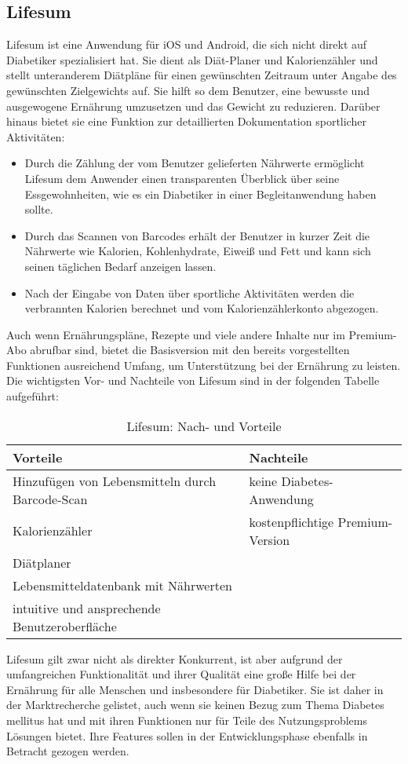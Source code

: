 	\subsection{Lifesum}
	Lifesum ist eine Anwendung für iOS und Android, die sich nicht direkt auf Diabetiker spezialisiert hat. Sie dient als Diät-Planer und Kalorienzähler und stellt unteranderem Diätpläne für einen gewünschten Zeitraum unter Angabe des gewünschten Zielgewichts auf. Sie hilft so dem Benutzer, eine bewusste und ausgewogene Ernährung umzusetzen und das Gewicht zu reduzieren. Darüber hinaus bietet sie eine Funktion zur detaillierten Dokumentation sportlicher Aktivitäten:
	\begin{itemize}
		\item Durch die Zählung der vom Benutzer gelieferten Nährwerte ermöglicht Lifesum dem Anwender einen transparenten Überblick über seine Essgewohnheiten, wie es ein Diabetiker in einer Begleitanwendung haben sollte. 
		\item Durch das Scannen von Barcodes erhält der Benutzer  in kurzer Zeit die Nährwerte wie Kalorien, Kohlenhydrate, Eiweiß und Fett und kann sich seinen täglichen Bedarf anzeigen lassen.
		\item Nach der Eingabe von Daten über sportliche Aktivitäten werden die verbrannten Kalorien berechnet und vom Kalorienzählerkonto abgezogen.
	\end{itemize}
	Auch wenn Ernährungspläne, Rezepte und viele andere Inhalte nur im Premium-Abo abrufbar sind, bietet die Basisversion mit den bereits vorgestellten Funktionen ausreichend Umfang, um Unterstützung bei der Ernährung zu leisten.\newline
	Die wichtigsten Vor- und Nachteile von Lifesum sind in der folgenden Tabelle aufgeführt\cite{L}:
	\begin{table}[H]
		\setlength{\tabcolsep}{12pt}
		\centering
		\begin{tabular}{p{6cm}|p{6cm}}
			\toprule
			\textbf{Vorteile} & \textbf{Nachteile}\\
			\hline
			Hinzufügen von Lebensmitteln durch Barcode-Scan & keine Diabetes-Anwendung\\
			\hline
			Kalorienzähler & kostenpflichtige Premium-Version\\
			\hline
			Diätplaner & \\
			\hline
			Lebensmitteldatenbank mit Nährwerten & \\
			\hline
			intuitive und ansprechende Benutzeroberfläche & \\
			\bottomrule
		\end{tabular}
		\captionsetup{justification=centering}
		\caption{Lifesum: Nach- und Vorteile}
		\label{tab:Lifesum}
	\end{table}
	\setlength{\parindent}{0pt}Lifesum gilt zwar nicht als direkter Konkurrent, ist aber aufgrund der umfangreichen Funktionalität und ihrer Qualität eine große Hilfe bei der Ernährung für alle Menschen und insbesondere für Diabetiker. Sie ist daher in der Marktrecherche gelistet, auch wenn sie keinen Bezug zum Thema Diabetes mellitus hat und mit ihren Funktionen nur für Teile des Nutzungsproblems Lösungen bietet. Ihre Features sollen in der Entwicklungsphase ebenfalls in Betracht gezogen werden.

